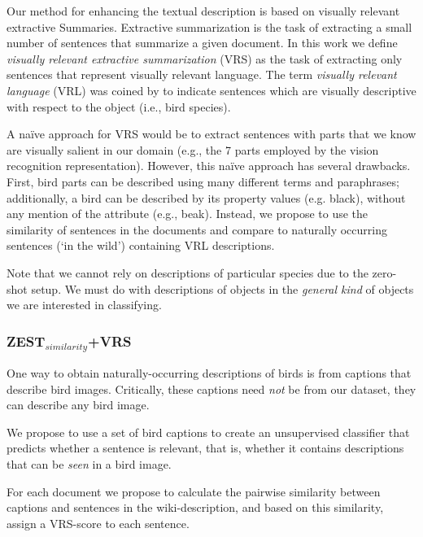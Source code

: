 \documentclass[11pt,a4paper]{article}
\begin{document}
Our method for enhancing the textual description is based on visually relevant extractive Summaries.
Extractive summarization is the task of extracting a small number of sentences that summarize a given document.
In this work we define {\em visually relevant extractive summarization} (VRS) as the task of extracting only sentences that represent {visually relevant} language. The term {\em visually relevant language} (VRL) was coined by \citet{winn2016detecting} to indicate sentences which are visually descriptive with respect to the object (i.e., bird species).


A {na\"{i}ve} approach for VRS would be to extract sentences with parts that we know are visually salient in our domain (e.g., the 7 parts employed by the vision recognition representation). However, this na\"{i}ve approach has several drawbacks. First, bird parts can be described using many different terms and paraphrases; additionally, a bird can be described by its property values (e.g. black), without any mention of the attribute (e.g., beak). 
Instead, we propose to use the similarity of sentences in the documents and compare to naturally occurring sentences (`in the wild') containing VRL descriptions. %

Note that we cannot rely on descriptions of particular species due to the zero-shot setup. We must do with descriptions of objects in the {\em general kind} %
of objects we are interested in classifying. 

\subsubsection{ZEST$_{similarity}$+VRS}
One way to obtain naturally-occurring descriptions of birds is from captions that describe bird images. Critically, these captions need {\em not} be from our dataset, they can describe any bird image. 

We propose to use a set of bird captions to create an unsupervised classifier that predicts whether a sentence is relevant, that is, whether it contains descriptions that can be {\em seen} in a bird image.

For each document we propose to calculate the pairwise similarity between captions and sentences in the wiki-description, and based on this similarity, assign a VRS-score to each sentence.
\end{document}

